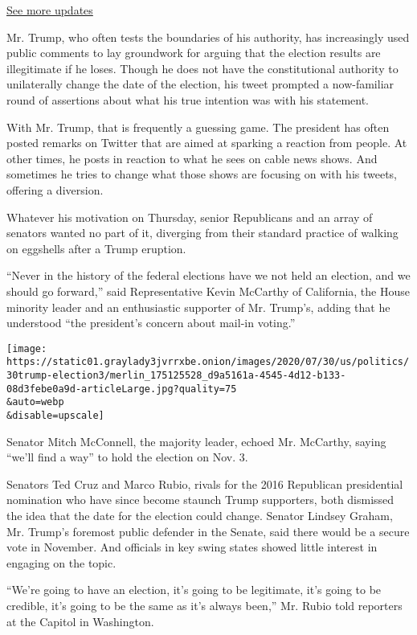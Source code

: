 \href{https://www.nytimes3xbfgragh.onion/2020/08/04/us/elections/primary-election-michigan-arizona-kansas.html?action=click\&pgtype=Article\&state=default\&region=MAIN_CONTENT_1\&context=storylines_live_updates}{See
more updates}

Mr. Trump, who often tests the boundaries of his authority, has
increasingly used public comments to lay groundwork for arguing that the
election results are illegitimate if he loses. Though he does not have
the constitutional authority to unilaterally change the date of the
election, his tweet prompted a now-familiar round of assertions about
what his true intention was with his statement.

With Mr. Trump, that is frequently a guessing game. The president has
often posted remarks on Twitter that are aimed at sparking a reaction
from people. At other times, he posts in reaction to what he sees on
cable news shows. And sometimes he tries to change what those shows are
focusing on with his tweets, offering a diversion.

Whatever his motivation on Thursday, senior Republicans and an array of
senators wanted no part of it, diverging from their standard practice of
walking on eggshells after a Trump eruption.

``Never in the history of the federal elections have we not held an
election, and we should go forward,'' said Representative Kevin McCarthy
of California, the House minority leader and an enthusiastic supporter
of Mr. Trump's, adding that he understood ``the president's concern
about mail-in voting.''

\texttt{[image: https://static01.graylady3jvrrxbe.onion/images/2020/07/30/us/politics/30trump-election3/merlin\_175125528\_d9a5161a-4545-4d12-b133-08d3febe0a9d-articleLarge.jpg?quality=75\\\&auto=webp\\\&disable=upscale]}

Senator Mitch McConnell, the majority leader, echoed Mr. McCarthy,
saying ``we'll find a way'' to hold the election on Nov. 3.

Senators Ted Cruz and Marco Rubio, rivals for the 2016 Republican
presidential nomination who have since become staunch Trump supporters,
both dismissed the idea that the date for the election could change.
Senator Lindsey Graham, Mr. Trump's foremost public defender in the
Senate, said there would be a secure vote in November. And officials in
key swing states showed little interest in engaging on the topic.

``We're going to have an election, it's going to be legitimate, it's
going to be credible, it's going to be the same as it's always been,''
Mr. Rubio told reporters at the Capitol in Washington.

